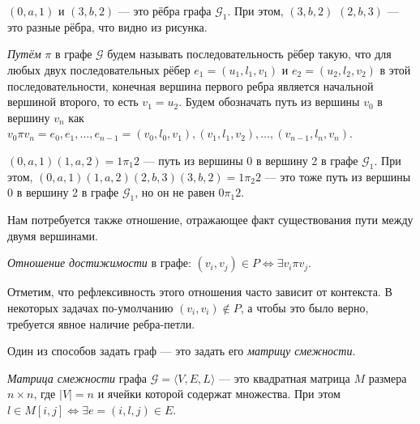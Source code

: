 \begin{example}
$(0,a,1)$  и $(3,b,2)$ --- это рёбра графа $\mathcal{G}_1$. При этом, $(3,b,2)$ $(2,b,3)$ --- это разные рёбра, что видно из рисунка.
\end{example}

\begin{definition}
  \textit{Путём} $\pi$ в графе $\mathcal{G}$ будем называть последовательность рёбер такую, что для любых двух последовательных рёбер $e_1=(u_1,l_1,v_1)$ и $e_2=(u_2,l_2,v_2)$ в этой последовательности, конечная вершина первого ребра является начальной вершиной второго, то есть $v_1 = u_2$. Будем обозначать путь из вершины $v_0$ в вершину $v_n$ как $v_0 \pi v_n = e_0,e_1, \dots, e_{n-1} = (v_0, l_0, v_1),(v_1,l_1,v_2),\dots,(v_{n-1},l_n,v_n)$.
  
\begin{center}
  \end{center}
\end{definition}

\begin{example}
$(0,a,1)(1,a,2) = 1\pi_1 2$  --- путь из вершины 0 в вершину 2 в графе $\mathcal{G}_1$.
При этом, $(0,a,1)(1,a,2)(2,b,3)(3,b,2) = 1\pi_2 2$ --- это тоже путь из вершины 0 в вершину 2 в графе $\mathcal{G}_1$, но он не равен $0\pi_1 2$.
\end{example}

Нам потребуется также отношение, отражающее факт существования пути между двумя вершинами.

\begin{definition}\label{def:reach}
  \textit{Отношение достижимости} в графе:
  $(v_i,v_j) \in P \iff \exists v_i \pi v_j$.
\end{definition}

Отметим, что рефлексивность этого отношения часто зависит от контекста.
В некоторых задачах по-умолчанию $(v_i,v_i) \notin P$, а чтобы это было верно, требуется явное наличие ребра-петли.

Один из способов задать граф --- это задать его \textit{матрицу смежности}.

\begin{definition}
  \textit{Матрица смежности} графа $\mathcal{G}=\langle V,E,L \rangle$ --- это квадратная матрица $M$ размера $n \times n$, где $|V| = n$ и ячейки которой содержат множества.
  При этом $l \in M[i,j] \iff \exists e = (i,l,j) \in E$.
\end{definition}

